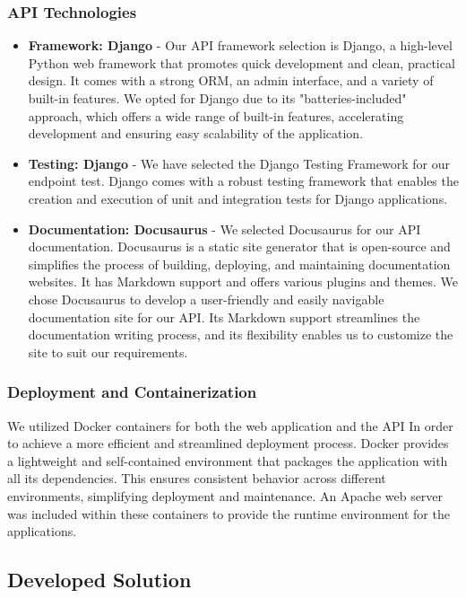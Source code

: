 \documentclass[12pt]{article}
\begin{document}
\subsubsection{API Technologies}
\begin{itemize}
	\item \textbf{Framework: Django\cite{django}} - Our API framework selection is Django, a high-level Python\cite{python} web framework that promotes quick development and clean, practical design. It comes with a strong ORM, an admin interface, and a variety of built-in features. We opted for Django due to its "batteries-included" approach, which offers a wide range of built-in features, accelerating development and ensuring easy scalability of the application.
	\item \textbf{Testing: Django} - We have selected the Django Testing Framework for our endpoint test. Django comes with a robust testing framework that enables the creation and execution of unit and integration tests for Django applications.
	\item \textbf{Documentation: Docusaurus\cite{docusaurus}} - We selected Docusaurus for our API documentation. Docusaurus is a static site generator that is open-source and simplifies the process of building, deploying, and maintaining documentation websites. It has Markdown support and offers various plugins and themes. We chose Docusaurus to develop a user-friendly and easily navigable documentation site for our API. Its Markdown support streamlines the documentation writing process, and its flexibility enables us to customize the site to suit our requirements.
\end{itemize}

\subsubsection{Deployment and Containerization}
We utilized Docker\cite{docker} containers for both the web application and the API In order to achieve a more efficient and streamlined deployment process. Docker provides a lightweight and self-contained environment that packages the application with all its dependencies. This ensures consistent behavior across different environments, simplifying deployment and maintenance. An Apache web server was included within these containers to provide the runtime environment for the applications.

\subsection{Developed Solution}
\end{document}
